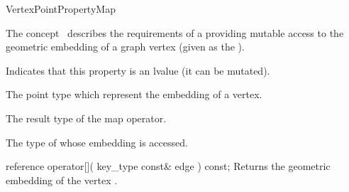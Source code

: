 
\begin{ccRefConcept}{VertexPointPropertyMap}


\ccDefinition

The concept \ccRefName\ describes the requirements of a  
providing mutable access to the geometric embedding of a graph vertex
(given as the ).

\ccRefines
  
\ccTypes
    {Indicates that this property is an lvalue (it can be mutated).}
  
    {The point type which represent the embedding of a vertex.}
    
    {The result type of the map operator.}

  {The type of  whose embedding is accessed.}

\ccCreation
{}  %

\ccOperations

\ccMethod
  {reference operator[]( key_type const& edge ) const;}
  {Returns the geometric embedding of the vertex .}  
  
\ccHasModels
{}\\

\ccSeeAlso
{} 

\end{ccRefConcept}



